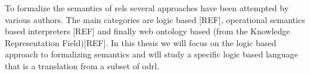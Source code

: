 To formalize the semantics of \ac{rel}s several approaches have been attempted by various authors. The main categories are logic based [REF], operational semantics based interpreters [REF] and finally web ontology based (from the Knowledge Representation Field)[REF]. In this thesis we will focus on the logic based approach to formalizing semantics and will study a specific logic based language that is a translation from a subset of \ac{odrl}.









